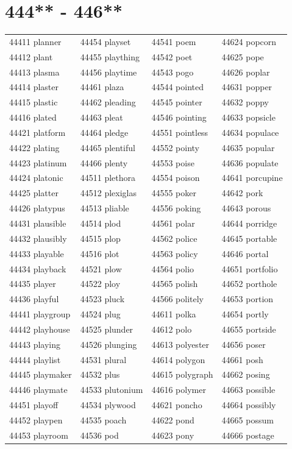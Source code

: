\documentclass[10pt, oneside]{book}
\begin{document}
\begin{table}
	\centering
	\section*{444** - 446**}
	\begin{tabular}{l l l l}
44411 planner &44454 playset &44541 poem &44624 popcorn\\
44412 plant &44455 plaything &44542 poet &44625 pope\\
44413 plasma &44456 playtime &44543 pogo &44626 poplar\\
44414 plaster &44461 plaza &44544 pointed &44631 popper\\
44415 plastic &44462 pleading &44545 pointer &44632 poppy\\
44416 plated &44463 pleat &44546 pointing &44633 popsicle\\
44421 platform &44464 pledge &44551 pointless &44634 populace\\
44422 plating &44465 plentiful &44552 pointy &44635 popular\\
44423 platinum &44466 plenty &44553 poise &44636 populate\\
44424 platonic &44511 plethora &44554 poison &44641 porcupine\\
44425 platter &44512 plexiglas &44555 poker &44642 pork\\
44426 platypus &44513 pliable &44556 poking &44643 porous\\
44431 plausible &44514 plod &44561 polar &44644 porridge\\
44432 plausibly &44515 plop &44562 police &44645 portable\\
44433 playable &44516 plot &44563 policy &44646 portal\\
44434 playback &44521 plow &44564 polio &44651 portfolio\\
44435 player &44522 ploy &44565 polish &44652 porthole\\
44436 playful &44523 pluck &44566 politely &44653 portion\\
44441 playgroup &44524 plug &44611 polka &44654 portly\\
44442 playhouse &44525 plunder &44612 polo &44655 portside\\
44443 playing &44526 plunging &44613 polyester &44656 poser\\
44444 playlist &44531 plural &44614 polygon &44661 posh\\
44445 playmaker &44532 plus &44615 polygraph &44662 posing\\
44446 playmate &44533 plutonium &44616 polymer &44663 possible\\
44451 playoff &44534 plywood &44621 poncho &44664 possibly\\
44452 playpen &44535 poach &44622 pond &44665 possum\\
44453 playroom &44536 pod &44623 pony &44666 postage\\
	\end{tabular}
 \end{table}
\clearpage
\end{document}
